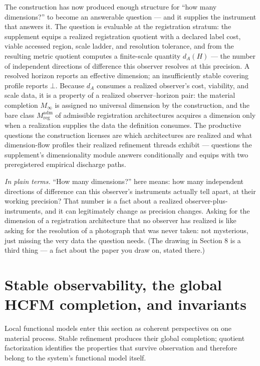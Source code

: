 \documentclass[11pt]{article}
\theoremstyle{definition}
\newcommand{\Minf}{M_\infty}
\newcommand{\plainterms}{\emph{In plain terms.}}
\begin{document}
The construction has now produced enough structure for ``how many dimensions?'' to become an answerable question --- and it supplies the instrument that answers it. The question is evaluable at the registration stratum: the supplement equips a realized registration quotient with a declared label cost, viable accessed region, scale ladder, and resolution tolerance, and from the resulting metric quotient computes a finite-scale quantity $d_A(H)$ --- the number of independent directions of difference this observer resolves at this precision. A resolved horizon reports an effective dimension; an insufficiently stable covering profile reports $\bot$. Because $d_A$ consumes a realized observer's cost, viability, and scale data, it is a property of a realized observer--horizon pair: the material completion $\Minf$ is assigned no universal dimension by the construction, and the bare class $M^{\mathrm{adm}}_{\mathrm{reg}}$ of admissible registration architectures acquires a dimension only when a realization supplies the data the definition consumes. The productive questions the construction licenses are which architectures are realized and what dimension-flow profiles their realized refinement threads exhibit --- questions the supplement's dimensionality module answers conditionally and equips with two preregistered empirical discharge paths.

\noindent\plainterms{} ``How many dimensions?'' here means: how many independent directions of difference can this observer's instruments actually tell apart, at their working precision? That number is a fact about a realized observer-plus-instruments, and it can legitimately change as precision changes. Asking for the dimension of a registration architecture that no observer has realized is like asking for the resolution of a photograph that was never taken: not mysterious, just missing the very data the question needs. (The drawing in Section 8 is a third thing --- a fact about the paper you draw on, stated there.)

\section{Stable observability, the global HCFM completion, and invariants}

Local functional models enter this section as coherent perspectives on one material process. Stable refinement produces their global completion; quotient factorization identifies the properties that survive observation and therefore belong to the system's functional model itself.
\end{document}
